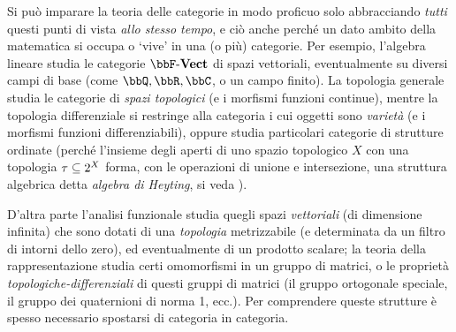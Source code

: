 Si può imparare la teoria delle categorie in modo proficuo solo abbracciando \emph{tutti} questi punti di vista \emph{allo stesso tempo}, e ciò anche perché un dato ambito della matematica si occupa o `vive' in una (o più) categorie. Per esempio, l'algebra lineare studia le categorie \(\ctVect\) di spazi vettoriali, eventualmente su diversi campi di base (come \(\bbQ,\bbR,\bbC\), o un campo finito). La topologia generale studia le categorie di \emph{spazi topologici} (e i morfismi funzioni continue), mentre la topologia differenziale si restringe alla categoria i cui oggetti sono \emph{varietà} (e i morfismi funzioni differenziabili), oppure studia particolari categorie di strutture ordinate (perché l'insieme degli aperti di uno spazio topologico \(X\) con una topologia \(\tau \subseteq 2^{X}\) forma, con le operazioni di unione e intersezione, una struttura algebrica detta \emph{algebra di Heyting}, si veda \cite{Esakia2019}).

D'altra parte l'analisi funzionale studia quegli spazi \emph{vettoriali} (di dimensione infinita) che sono dotati di una \emph{topologia} metrizzabile (e determinata da un filtro di intorni dello zero), ed eventualmente di un prodotto scalare; la teoria della rappresentazione studia certi omomorfismi in un gruppo di matrici, o le proprietà \emph{topologiche-differenziali} di questi gruppi di matrici (il gruppo ortogonale speciale, il gruppo dei quaternioni di norma 1, ecc.). Per comprendere queste strutture è spesso necessario spostarsi di categoria in categoria.

